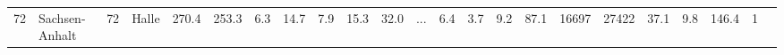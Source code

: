 \documentclass[11pt]{article}
\begin{document}
\begin{tabular}{r|llllllllllllllllllllll}
	72 & Sachsen-Anhalt                                                                     & 72                                                                                 & Halle                                                                              & 270.4                                                                              & 253.3                                                                              &  6.3                                                                               & 14.7                                                                               & 7.9                                                                                & 15.3                                                                               & 32.0                                                                               & ...                                                                                &  6.4                                                                               &  3.7                                                                               &  9.2                                                                               & 87.1                                                                               & 16697                                                                              & 27422                                                                              & 37.1                                                                               &  9.8                                                                               & 146.4                                                                              & 1                                                                                 \\

\end{tabular}
\end{document}
